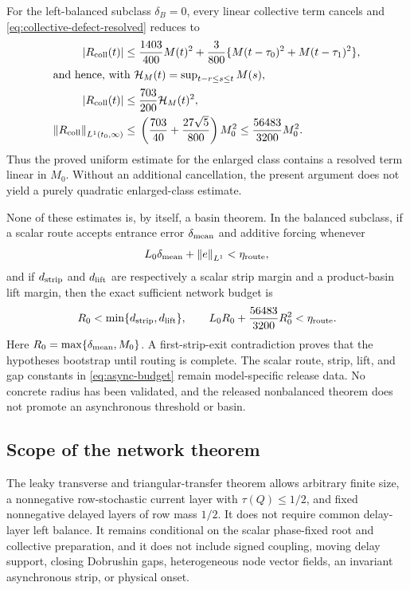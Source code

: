 For the left-balanced subclass \(\delta_B=0\), every linear collective term
cancels and \cref{eq:collective-defect-resolved} reduces to
\begin{align}
 |R_{\rm coll}(t)|\le{}&\frac{1403}{400}M(t)^2
 +\frac3{800}\{M(t-\tau_0)^2+M(t-\tau_1)^2\},\notag\\
 \intertext{and hence, with
 \(\mathcal H_M(t)=\sup_{t-r\le s\le t}M(s)\),}
 |R_{\rm coll}(t)|\le{}&\frac{703}{200}\mathcal H_M(t)^2,\notag\\
 \left\lVert R_{\rm coll}\right\rVert_{L^1(t_0,\infty)}
 \le{}&\left(\frac{703}{40}+\frac{27\sqrt5}{800}\right)M_0^2
 \le\frac{56483}{3200}M_0^2.                           \label{eq:balanced-collective-defect}
\end{align}
Thus the proved uniform estimate for the enlarged class contains a resolved
term linear in \(M_0\).  Without an additional cancellation, the present
argument does not yield a purely quadratic enlarged-class estimate.

None of these estimates is, by itself, a basin theorem.  In the balanced
subclass, if a scalar route accepts entrance error
\(\delta_{\rm mean}\) and additive forcing whenever
\[
 L_0\delta_{\rm mean}+\left\lVert e\right\rVert_{L^1}<\eta_{\rm route},
\]
and if \(d_{\rm strip}\) and \(d_{\rm lift}\) are respectively a scalar
strip margin and a product-basin lift margin, then the exact sufficient
network budget is
\begin{equation}
 R_0<\min\{d_{\rm strip},d_{\rm lift}\},\qquad
 L_0R_0+\frac{56483}{3200}R_0^2<\eta_{\rm route}.       \label{eq:async-budget}
\end{equation}
Here \(R_0=\max\{\delta_{\rm mean},M_0\}\).  A first-strip-exit
contradiction proves that the hypotheses bootstrap until routing is
complete.  The scalar route, strip, lift, and gap constants in
\cref{eq:async-budget} remain model-specific release data.  No concrete
radius has been validated, and the released nonbalanced theorem does not
promote an asynchronous threshold or basin.

\subsection{Scope of the network theorem}

The leaky transverse and triangular-transfer theorem allows arbitrary finite
size, a nonnegative row-stochastic current layer with
\(\tau(Q)\le1/2\), and fixed nonnegative delayed layers of row mass \(1/2\).
It does not require common delay-layer left balance.  It remains conditional
on the scalar phase-fixed root and collective preparation, and it does not
include signed coupling, moving delay support, closing Dobrushin gaps,
heterogeneous node vector fields, an invariant asynchronous strip, or
physical onset.

